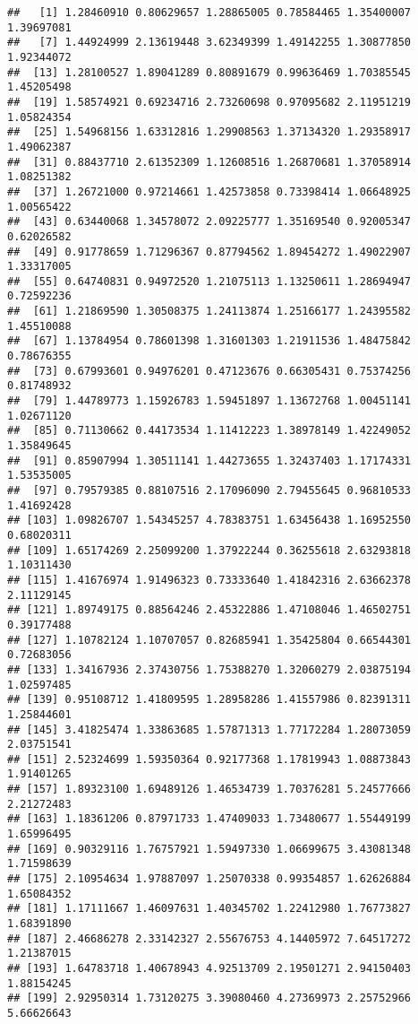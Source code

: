 \documentclass[
]{article}
\begin{document}
\begin{verbatim}
##   [1] 1.28460910 0.80629657 1.28865005 0.78584465 1.35400007 1.39697081
##   [7] 1.44924999 2.13619448 3.62349399 1.49142255 1.30877850 1.92344072
##  [13] 1.28100527 1.89041289 0.80891679 0.99636469 1.70385545 1.45205498
##  [19] 1.58574921 0.69234716 2.73260698 0.97095682 2.11951219 1.05824354
##  [25] 1.54968156 1.63312816 1.29908563 1.37134320 1.29358917 1.49062387
##  [31] 0.88437710 2.61352309 1.12608516 1.26870681 1.37058914 1.08251382
##  [37] 1.26721000 0.97214661 1.42573858 0.73398414 1.06648925 1.00565422
##  [43] 0.63440068 1.34578072 2.09225777 1.35169540 0.92005347 0.62026582
##  [49] 0.91778659 1.71296367 0.87794562 1.89454272 1.49022907 1.33317005
##  [55] 0.64740831 0.94972520 1.21075113 1.13250611 1.28694947 0.72592236
##  [61] 1.21869590 1.30508375 1.24113874 1.25166177 1.24395582 1.45510088
##  [67] 1.13784954 0.78601398 1.31601303 1.21911536 1.48475842 0.78676355
##  [73] 0.67993601 0.94976201 0.47123676 0.66305431 0.75374256 0.81748932
##  [79] 1.44789773 1.15926783 1.59451897 1.13672768 1.00451141 1.02671120
##  [85] 0.71130662 0.44173534 1.11412223 1.38978149 1.42249052 1.35849645
##  [91] 0.85907994 1.30511141 1.44273655 1.32437403 1.17174331 1.53535005
##  [97] 0.79579385 0.88107516 2.17096090 2.79455645 0.96810533 1.41692428
## [103] 1.09826707 1.54345257 4.78383751 1.63456438 1.16952550 0.68020311
## [109] 1.65174269 2.25099200 1.37922244 0.36255618 2.63293818 1.10311430
## [115] 1.41676974 1.91496323 0.73333640 1.41842316 2.63662378 2.11129145
## [121] 1.89749175 0.88564246 2.45322886 1.47108046 1.46502751 0.39177488
## [127] 1.10782124 1.10707057 0.82685941 1.35425804 0.66544301 0.72683056
## [133] 1.34167936 2.37430756 1.75388270 1.32060279 2.03875194 1.02597485
## [139] 0.95108712 1.41809595 1.28958286 1.41557986 0.82391311 1.25844601
## [145] 3.41825474 1.33863685 1.57871313 1.77172284 1.28073059 2.03751541
## [151] 2.52324699 1.59350364 0.92177368 1.17819943 1.08873843 1.91401265
## [157] 1.89323100 1.69489126 1.46534739 1.70376281 5.24577666 2.21272483
## [163] 1.18361206 0.87971733 1.47409033 1.73480677 1.55449199 1.65996495
## [169] 0.90329116 1.76757921 1.59497330 1.06699675 3.43081348 1.71598639
## [175] 2.10954634 1.97887097 1.25070338 0.99354857 1.62626884 1.65084352
## [181] 1.17111667 1.46097631 1.40345702 1.22412980 1.76773827 1.68391890
## [187] 2.46686278 2.33142327 2.55676753 4.14405972 7.64517272 1.21387015
## [193] 1.64783718 1.40678943 4.92513709 2.19501271 2.94150403 1.88154245
## [199] 2.92950314 1.73120275 3.39080460 4.27369973 2.25752966 5.66626643

\end{verbatim}
\end{document}
